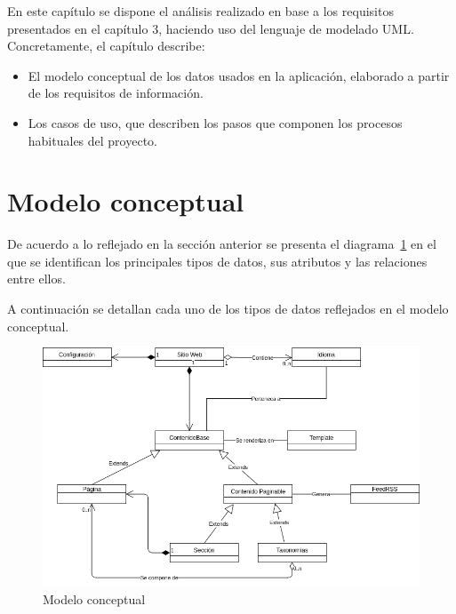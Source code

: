 En este capítulo se dispone el análisis realizado en base a los requisitos presentados
en el capítulo 3, haciendo uso del lenguaje de modelado UML. Concretamente,
el capítulo describe:

\begin{itemize}
\item El modelo conceptual de los datos usados en la aplicación, elaborado a
partir de los requisitos de información.
\item Los casos de uso, que describen los pasos que componen los procesos habituales del proyecto.
\end{itemize}


\section{Modelo conceptual}

De acuerdo a lo reflejado en la sección anterior se presenta el diagrama~\ref{fig:modelo-conceptual}  en el
que se identifican los principales tipos de datos, sus atributos y las relaciones entre
ellos.

A continuación se detallan cada uno de los tipos de datos reflejados en el modelo
conceptual.

\begin{figure}[htbp]
    \centering
    \includegraphics[width=1.1\textwidth]{4_analisis/modelo_conceptual}
    \caption{Modelo conceptual}
    \label{fig:modelo-conceptual}
\end{figure}

